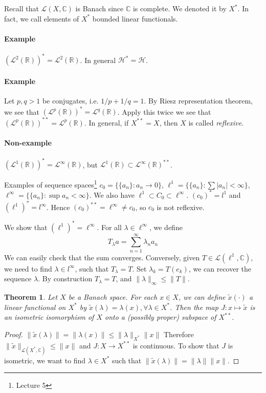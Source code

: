\documentclass[12pt]{article}
\theoremstyle{plain}
\newtheorem{theorem}[equation]{Theorem}
\theoremstyle{definition}
\theoremstyle{named}
\newcommand{\sL}{\mathcal{L}}
\newcommand{\shH}{\mathscr{H}}
\newcommand{\shL}{\mathscr{L}}
\newcommand{\<}{\langle}
\renewcommand{\>}{\rangle}
\def\wt{\widetilde}
\newcommand{\IR}{\mathbb{R}}
\newcommand{\IC}{\mathbb{C}}
\begin{document}
Recall that $\shL(X, \IC)$ is Banach since $\IC$ is complete. We denoted it by $X^*$. In fact, we call elements of $X^*$ bounded linear functionals. 

\paragraph{Example} $(\sL^2(\IR))^* = \sL^2(\IR)$. In general $\shH^* = \shH$. 
\paragraph{Example} Let $p, q > 1$ be conjugates, i.e. $1/p + 1/q = 1$. By Riesz representation theorem, we see that $(\sL^p(\IR))^* = \sL^q(\IR)$. Apply this twice we see that $(\sL^p(\IR))^{**} =\sL^p(\IR)$. In general, if $X^{**} = X$, then $X$ is called \textit{reflexive}. 

\paragraph{Non-example} $(\sL^1(\IR))^* = \sL^\infty(\IR)$, but $\sL^1(\IR) \subset \sL^\infty(\IR)^{**}$. 

Examples of sequence spaces\footnote{Lecture 5} $c_0 = \{ \{ a_n \} : a_n \to 0 \}$, $\ell^1 = \{ \{ a_n \} : \sum |a_n| < \infty \}$, $\ell^\infty = \{ \{ a_n \} : \sup a_n < \infty \}$. We also have $\ell^1 \subset C_0 \subset \ell^\infty$. $(c_0)^* = l^1$ and $(\ell^1)^* = l^\infty$. Hence $(c_0)^{**} = \ell^\infty \neq c_0$, so $c_0$ is not reflexive. 

We show that $(\ell^1)^* = \ell^\infty$. For all $\lambda \in \ell^\infty$, we define 
$$ T_\lambda a = \sum_{n = 1}^\infty \lambda_n a_n $$
We can easily check that the sum converges. Conversely, given $T \in \shL(\ell^1, \IC)$, we need to find $\lambda \in l^\infty$, such that $T_\lambda = T$. Set $\lambda_k = T(e_k)$, we can recover the sequence $\lambda$. By construction $T_\lambda = T$, and $\| \lambda \|_\infty \le \| T \|$.

\begin{theorem}
Let $X$ be a Banach space. For each $x \in X$, we can define $\wt{x}(\cdot)$ a linear functional on $X^*$ by $\wt{x}(\lambda) = \lambda(x), \forall \lambda \in X^*$. Then the map $J : x \mapsto \wt{x}$ is an isometric isomorphism of $X$ onto a (possibly proper) subspace of $X^{**}$. 
\end{theorem} 
\begin{proof}
$\| \wt{x} (\lambda) \| = \| \lambda(x) \| \le \| \lambda \|_{X^*} \| x \|$ Therefore $\| \wt{x} \|_{\shL(X^*, \IC)} \le \| x \|$ and $J : X \to X^{**}$ is continuous. To show that $J$ is isometric, we want to find $\lambda \in X^*$ such that $\| \wt{x}(\lambda) \| = \|\lambda \| \| x \|$. 
\end{proof}
 
\end{document}
